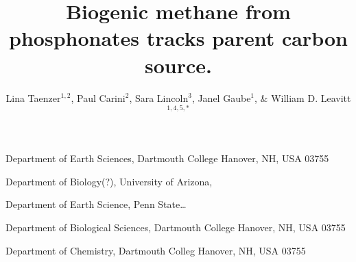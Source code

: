 \documentclass{nature}
\title{Biogenic methane from phosphonates tracks parent carbon source.}
\author{Lina Taenzer$^{1,2}$, Paul Carini$^2$, Sara Lincoln$^3$, Janel Gaube$^1$, \& William D. Leavitt$^{1,4,5,*}$}
\begin{document}
\maketitle

\begin{affiliations}
 \item Department of Earth Sciences, Dartmouth College Hanover, NH, USA 03755 
 \item Department of Biology(?), University of Arizona, 
 \item Department of Earth Science, Penn State…
 \item Department of Biological Sciences, Dartmouth College Hanover, NH, USA 03755
 \item Department of Chemistry, Dartmouth Colleg Hanover, NH, USA 03755
\end{affiliations}
\end{document}
